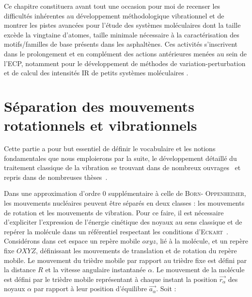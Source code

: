 \documentclass[12pt,a4paper]{book}
\begin{document}
Ce chapitre constituera avant tout une occasion pour moi de recenser les difficultés inhérentes au développement méthodologique vibrationnel et de montrer les pistes avancées pour l'étude des systèmes moléculaires dont la taille excède la vingtaine d'atomes, taille minimale nécessaire à la caractérisation des motifs/familles de base présents dans les asphaltènes. Ces activités s’inscrivent dans le prolongement et en complément des actions antérieures menées au sein de l'ECP, notamment pour le développement de méthodes de variation-perturbation et de calcul des intensités IR de petits systèmes moléculaires \cite{krusic1991electron}. 



\section[Séparation des mouvements]{Séparation des mouvements rotationnels et vibrationnels}

Cette partie a pour but essentiel de définir le vocabulaire et les notions fondamentales que nous emploierons par la suite, le développement détaillé du traitement classique de la vibration se trouvant dans de nombreux ouvrages~\cite{barchewitz1971spectroscopie,wilson1955molecular,wilson1955molecular} et repris dans de nombreuses thèses~\cite{pouchan1978approche,zaki1996etude}.

Dans une approximation d'ordre 0 supplémentaire à celle de \textsc{Born}- \textsc{Oppenheimer}, les mouvements nucléaires peuvent être séparés en deux classes : les mouvements de rotation et les mouvements de vibration.
Pour ce faire, il est nécessaire d'expliciter l'expression de l'énergie cinétique des noyaux au sens classique et de repérer la molécule dans un référentiel respectant les conditions d'\textsc{Eckart}~\cite{eckart1935some}.
Considérons dans cet espace un repère mobile $oxyz$, lié à la molécule, et un repère fixe $OXYZ$, définissant les mouvements de translation et de rotation du repère mobile. Le mouvement du trièdre mobile par rapport au trièdre fixe est défini par la distance $R$ et la vitesse angulaire instantanée $\alpha$.
Le mouvement de la molécule est défini par le trièdre mobile représentant à chaque instant la position $\stackrel{\rightarrow}{r_{\alpha}}$ des noyaux $\alpha$ par rapport à leur position d'équilibre $\stackrel{\rightarrow}{a_{\alpha}}$. Soit : 
\end{document}
